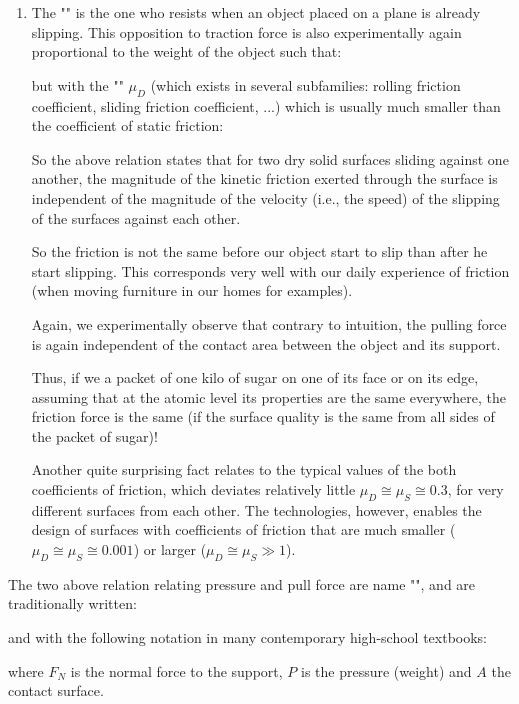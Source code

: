 \begin{enumerate}
		\item  The "" is the one who resists when an object placed on a plane is already slipping. This opposition to traction force is also experimentally again proportional to the weight of the object such that:
		
		but with the "" $\mu_D$ (which exists in several subfamilies: rolling friction coefficient, sliding friction coefficient, ...) which is usually much smaller than the coefficient of static friction:
		
		So the above relation states that for two dry solid surfaces sliding against one another, the magnitude of the kinetic friction exerted through the surface is independent of the magnitude of the velocity (i.e., the speed) of the slipping of the surfaces against each other.
		
		So the friction is not the same before our object start to slip than after he start slipping. This corresponds very well with our daily experience of friction (when moving furniture in our homes for examples).

		Again, we experimentally observe that contrary to intuition, the pulling force is again independent of the contact area between the object and its support.

		Thus, if we a packet of one kilo of sugar on one of its face or on its edge, assuming that at the atomic level its properties are the same everywhere, the friction force is the same (if the surface quality is the same from all sides of the packet of sugar)!
		
		Another quite surprising fact relates to the typical values of the both coefficients of friction, which deviates relatively little $\mu_D\cong \mu_S\cong 0.3$, for very different surfaces from each other. The technologies, however, enables the design of surfaces with coefficients of friction that are much smaller ($\mu_D\cong \mu_S\cong 0.001$) or larger ($\mu_D\cong \mu_S\gg 1$).
	\end{enumerate}
	The two above relation relating pressure and pull force are name "", and are traditionally written:
	
	and with the following notation in many contemporary high-school textbooks:
	
	where $F_N$ is the normal force to the support, $P$ is the pressure (weight) and $A$ the contact surface.
	
